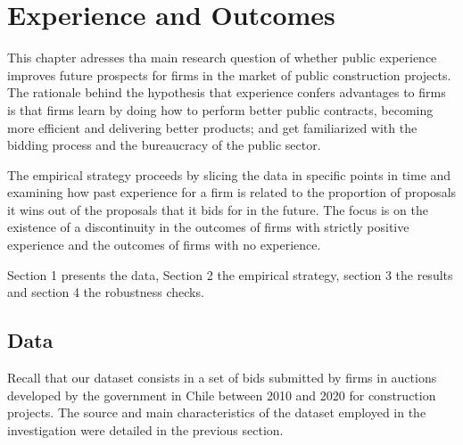 \chapter{Experience and Outcomes
}
This chapter adresses tha main research question of whether public experience improves future prospects for firms in the market of public construction projects.  The rationale behind the hypothesis that experience confers advantages to firms is that firms learn by doing how to perform better public contracts, becoming more efficient and delivering better products; and get familiarized with the bidding process and the bureaucracy of the public sector.

The empirical strategy proceeds by slicing the data in specific points in time and examining how past experience for a firm is related to the proportion of proposals it wins out of the proposals that it bids for in the future. The focus is on the existence of a discontinuity in the outcomes of firms with strictly positive experience and the outcomes of firms with no experience.

Section 1 presents the data, Section 2 the empirical strategy, section 3 the results and section 4 the robustness checks.

\section{Data}
\label{section:datamain}
Recall that our dataset consists in a set of bids submitted by firms in auctions developed by the government in Chile between 2010 and 2020 for construction projects. The source and main characteristics of the dataset employed in the investigation were detailed in the previous section.


